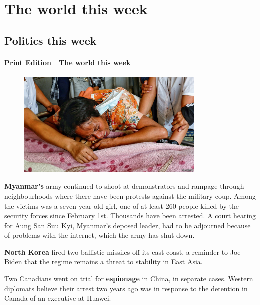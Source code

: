 \documentclass{article}
\begin{document}
\begin{multicols}{2}
\tableofcontents
\end{multicols}
\newpage
\section{The world this week }
\subsubsection{ }
\subsection{Politics this week }
\paragraph{Print Edition | The world this week  \quad \color{gray}{Mar 25th 2021 }}
\begin{figure}[h]
\centering
\includegraphics[width=0.8\textwidth]{images/20210327_WWP003_0.jpg}
\end{figure}
\textbf{Myanmar's} army continued to shoot at demonstrators and rampage through neighbourhoods where there have been protests against the military coup. Among the victims was a seven-year-old girl, one of at least 260 people killed by the security forces since February 1st. Thousands have been arrested. A court hearing for Aung San Suu Kyi, Myanmar's deposed leader, had to be adjourned because of problems with the internet, which the army has shut down. 

\textbf{North Korea} fired two ballistic missiles off its east coast, a reminder to Joe Biden that the regime remains a threat to stability in East Asia. 

Two Canadians went on trial for \textbf{espionage} in China, in separate cases. Western diplomats believe their arrest two years ago was in response to the detention in Canada of an executive at Huawei. 
\end{document}
